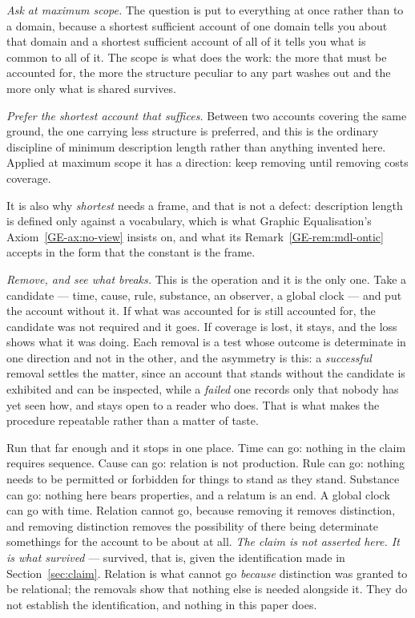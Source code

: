 \documentclass[11pt,a4paper]{article}
\theoremstyle{remark}\newtheorem{remark}[proposition]{Remark}
\begin{document}
\emph{Ask at maximum scope.} The question is put to everything at once rather than to a domain, because
a shortest sufficient account of one domain tells you about that domain and a shortest sufficient
account of all of it tells you what is common to all of it. The scope is what does the work: the more
that must be accounted for, the more the structure peculiar to any part washes out and the more only
what is shared survives.

\emph{Prefer the shortest account that suffices.} Between two accounts covering the same ground, the one
carrying less structure is preferred, and this is the ordinary discipline of minimum description length
rather than anything invented here. Applied at maximum scope it has a direction: keep removing until
removing costs coverage.

It is also why \emph{shortest} needs a frame, and that is not a defect: description length is defined
only against a vocabulary, which is what Graphic Equalisation's Axiom~\ref{GE-ax:no-view} insists on,
and what its Remark~\ref{GE-rem:mdl-ontic} accepts in the form that the constant is the frame.

\emph{Remove, and see what breaks.} This is the operation and it is the only one. Take a candidate ---
time, cause, rule, substance, an observer, a global clock --- and put the account without it. If what
was accounted for is still accounted for, the candidate was not required and it goes. If coverage is
lost, it stays, and the loss shows what it was doing. Each removal is a test whose outcome is determinate in one
direction and not in the other, and the asymmetry is this: a
\emph{successful} removal settles the matter, since an account that stands without the candidate is
exhibited and can be inspected, while a \emph{failed} one records only that nobody has yet seen how,
and stays open to a reader who does. That is what makes the procedure repeatable rather than a matter
of taste.

Run that far enough and it stops in one place. Time can go: nothing in the claim requires sequence.
Cause can go: relation is not production. Rule can go: nothing needs to be permitted or forbidden for
things to stand as they stand. Substance can go: nothing here bears properties, and a relatum is an
end. A global clock can go with time. Relation cannot go, because removing it removes distinction, and removing
distinction removes the possibility of there being determinate somethings for the account to be about at
all. \emph{The claim is not asserted here. It is what survived} --- survived, that is, given the
identification made in Section~\ref{sec:claim}. Relation is what cannot go \emph{because} distinction
was granted to be relational; the removals show that nothing else is needed alongside it. They do not
establish the identification, and nothing in this paper does.
\end{document}
